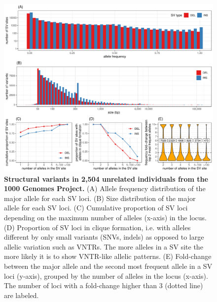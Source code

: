 \documentclass[11pt]{ucscthesis}
\begin{document}
\begin{figure}[p]
    \centering
    \includegraphics[width=\linewidth]{fig-sv-1kgp-stats.pdf}
    \caption[Structural variants in 2,504 unrelated individuals from the 1000 Genomes Project]{\textbf{Structural variants in 2,504 unrelated individuals from the 1000 Genomes Project.}
      (A) Allele frequency distribution of the major allele for each SV loci.
      (B) Size distribution of the major allele for each SV loci.
      (C) Cumulative proportion of SV loci depending on the maximum number of alleles (x-axis) in the locus.
      (D) Proportion of SV loci in clique formation, i.e. with alleles different by only small variants (SNVs, indels) as opposed to large allelic variation such as VNTRs.
      The more alleles in a SV site the more likely it is to show VNTR-like allelic patterns.
      (E) Fold-change between the major allele and the second most frequent allele in a SV loci (y-axis), grouped by the number of alleles in the locus (x-axis).
      The number of loci with a fold-change higher than 3 (dotted line) are labeled.
    }
    \label{fig:sv-1kgp-stats}
\end{figure}
\end{document}
